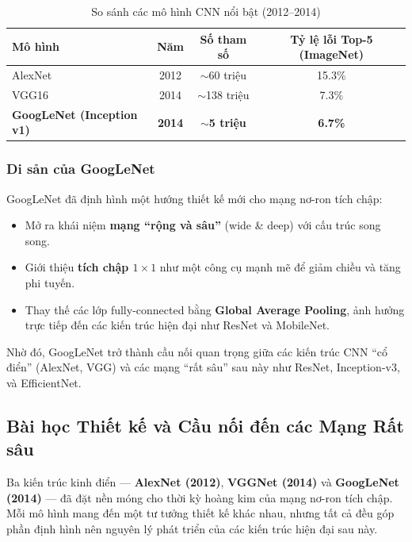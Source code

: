 \begin{table}[h!]
	\centering
	\caption{So sánh các mô hình CNN nổi bật (2012–2014)}
	\label{tab:cnn_comparison_2012_2014}
	\begin{tabular}{|l|c|c|c|}
		\hline
		\textbf{Mô hình} & \textbf{Năm} & \textbf{Số tham số} & \textbf{Tỷ lệ lỗi Top-5 (ImageNet)} \\
		\hline
		AlexNet & 2012 & $\sim$60 triệu & 15.3\% \\
		VGG16 & 2014 & $\sim$138 triệu & 7.3\% \\
		\textbf{GoogLeNet (Inception v1)} & \textbf{2014} & \textbf{$\sim$5 triệu} & \textbf{6.7\%} \\
		\hline
	\end{tabular}
\end{table}

\subsubsection{Di sản của GoogLeNet}
GoogLeNet đã định hình một hướng thiết kế mới cho mạng nơ-ron tích chập:
\begin{itemize}
	\item Mở ra khái niệm \textbf{mạng “rộng và sâu”} (wide \& deep) với cấu trúc song song.
	\item Giới thiệu \textbf{tích chập $1 \times 1$} như một công cụ mạnh mẽ để giảm chiều và tăng phi tuyến.
	\item Thay thế các lớp fully-connected bằng \textbf{Global Average Pooling}, ảnh hưởng trực tiếp đến các kiến trúc hiện đại như ResNet và MobileNet.
\end{itemize}

Nhờ đó, GoogLeNet trở thành cầu nối quan trọng giữa các kiến trúc CNN “cổ điển” (AlexNet, VGG) và các mạng “rất sâu” sau này như ResNet, Inception-v3, và EfficientNet.

\subsection{Bài học Thiết kế và Cầu nối đến các Mạng Rất sâu}
\label{subsec:lessons_from_classics}

Ba kiến trúc kinh điển — \textbf{AlexNet (2012)}, \textbf{VGGNet (2014)} và \textbf{GoogLeNet (2014)} — đã đặt nền móng cho thời kỳ hoàng kim của mạng nơ-ron tích chập. Mỗi mô hình mang đến một tư tưởng thiết kế khác nhau, nhưng tất cả đều góp phần định hình nên nguyên lý phát triển của các kiến trúc hiện đại sau này.

